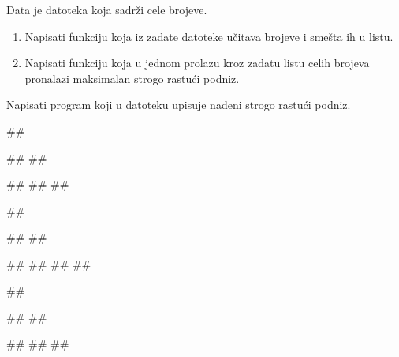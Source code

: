 \begin{Exercise}[label=611]
Data je datoteka  koja sadrži cele brojeve.
\begin{enumerate}
 \item Napisati funkciju koja iz zadate datoteke učitava brojeve i smešta ih u listu.
 \item Napisati funkciju koja u jednom prolazu kroz zadatu listu celih brojeva 
pronalazi maksimalan strogo rastući podniz.
\end{enumerate}
Napisati program koji u datoteku  upisuje nađeni strogo rastući podniz.

\noindent
\begin{minitest}
\begin{test}{1}
##

##
##

#\naslovIzlaz#
##
##
\end{test}
\end{minitest}
\begin{minitest}
\begin{test}{2}
##

##
##

#\naslovIzlaz#
##
##
##
\end{test}
\end{minitest}
\begin{minitest}
\begin{test}{3}
##

##
##

#\naslovIzlaz#
##
##
\end{test}
\end{minitest}
\end{Exercise}


